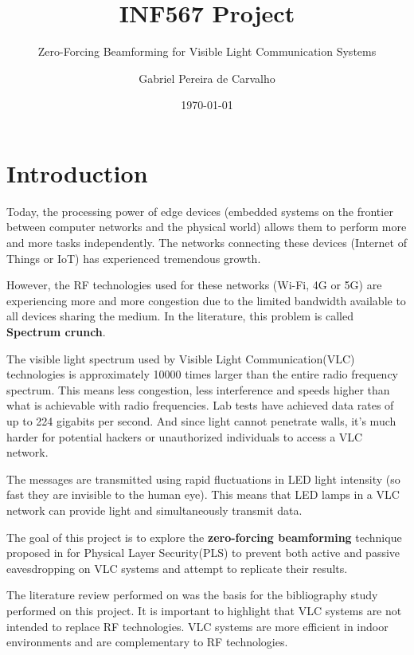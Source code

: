 \documentclass[a4paper,12pt,twoside]{article}
\title{INF567 Project}
\subtitle{Zero-Forcing Beamforming for Visible Light Communication Systems}
\author{Gabriel Pereira de Carvalho}
\date{\today}
\begin{document}
	
	\maketitle
	
	\tableofcontents
	
	\newpage
	
	\section{Introduction}
	
	Today, the processing power of edge devices (embedded systems on the frontier between computer networks and the physical world) allows them to perform more and more tasks independently. The networks connecting these devices (Internet of Things or IoT) has experienced tremendous growth.
	
	However, the RF technologies used for these networks (Wi-Fi, 4G or 5G) are experiencing more and more congestion due to the limited bandwidth available to all devices sharing the medium. In the literature, this problem is called \textbf{Spectrum crunch}.
	
	The visible light spectrum used by Visible Light Communication(VLC) technologies is approximately 10000 times larger than the entire radio frequency spectrum. This means less congestion, less interference and speeds higher than what is achievable with radio frequencies. Lab tests have achieved data rates of up to 224 gigabits per second. And since light cannot penetrate walls, it's much harder for potential hackers or unauthorized individuals to access a VLC network.
	
	The messages are transmitted using rapid fluctuations in LED light intensity (so fast they are invisible to the human eye). This means that LED lamps in a VLC network can provide light and simultaneously transmit data.
	
	The goal of this project is to explore the \textbf{zero-forcing beamforming} technique proposed in \cite{Oxford2021} for Physical Layer Security(PLS) to prevent both active and passive eavesdropping on VLC systems and attempt to replicate their results.
	
	The literature review performed on \cite{Edinburgh2020} was the basis for the bibliography study performed on this project. It is important to highlight that VLC systems are not intended to replace RF technologies. VLC systems are more efficient in indoor environments and are complementary to RF technologies.
	
\end{document}
